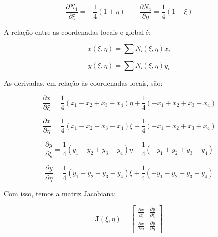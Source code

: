         \begin{equation}
            \frac{\partial N_4}{\partial \xi} = -\frac{1}{4}\left(1+\eta\right)  \quad \quad 
            \frac{\partial N_4}{\partial \eta} = \frac{1}{4}\left(1-\xi\right)
        \end{equation}


        A relação entre as coordenadas locais e global é:

        \begin{equation*}
            x(\xi, \eta) = \sum N_i(\xi,\eta) x_i
        \end{equation*}

        \begin{equation}
            y(\xi, \eta) = \sum N_i(\xi,\eta) y_i
        \end{equation}

        As derivadas, em relação às coordenadas locais, são:

        \begin{equation*}
            \frac{\partial x}{\partial \xi} = \frac{1}{4}\left(x_1-x_2+x_3-x_4\right)\eta + \frac{1}{4}\left(-x_1+x_2+x_3-x_4\right)
        \end{equation*}

        \begin{equation*}
            \frac{\partial x}{\partial \eta} = \frac{1}{4}\left(x_1-x_2+x_3-x_4\right)\xi + \frac{1}{4}\left(-x_1-x_2+x_3+x_4\right)
        \end{equation*}

        \begin{equation*}
            \frac{\partial y}{\partial \xi} = \frac{1}{4}\left(y_1-y_2+y_3-y_4\right)\eta + \frac{1}{4}\left(-y_1+y_2+y_3-y_4\right)
        \end{equation*}

        \begin{equation*}
            \frac{\partial y}{\partial \eta} = \frac{1}{4}\left(y_1-y_2+y_3-y_4\right)\xi + \frac{1}{4}\left(-y_1-y_2+y_3+y_4\right)
        \end{equation*}


        Com isso, temos a matriz Jacobiana:

        \begin{equation}
            \mathbf{J}(\xi, \eta) = 
            \begin{bmatrix}
                 \frac{\partial x}{\partial \xi} &  \frac{\partial y}{\partial \xi}\\
                 \frac{\partial x}{\partial \eta} &  \frac{\partial y}{\partial \eta}
            \end{bmatrix}
        \end{equation}

